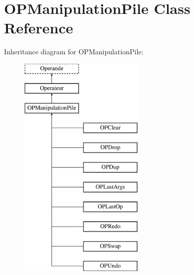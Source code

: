 \hypertarget{class_o_p_manipulation_pile}{}\section{O\+P\+Manipulation\+Pile Class Reference}
\label{class_o_p_manipulation_pile}
Inheritance diagram for O\+P\+Manipulation\+Pile\+:\begin{figure}[H]
\begin{center}
\leavevmode
\includegraphics[height=11.000000cm]{class_o_p_manipulation_pile}
\end{center}
\end{figure}
